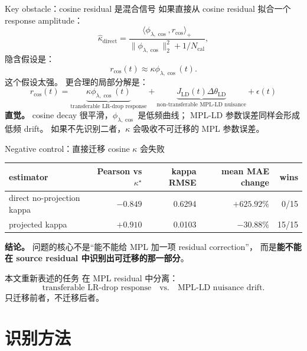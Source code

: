 \documentclass[9pt,aspectratio=169,fontset=fandol]{ctexbeamer}
\newcommand{\hl}[1]{\textcolor{blue!60!black}{\textbf{#1}}}
\begin{document}
\begin{frame}{Key obstacle：cosine residual 是混合信号}
\small
如果直接从 cosine residual 拟合一个 response amplitude：
\[
\widehat\kappa_{\mathrm{direct}}
=
\frac{\langle \phi_{\lambda,\cos},r_{\cos}\rangle_+}
{\|\phi_{\lambda,\cos}\|_2^2+1/N_{\mathrm{cal}}},
\]
隐含假设是：
\[
r_{\cos}(t)\approx \kappa\phi_{\lambda,\cos}(t).
\]
这个假设太强。
\vfill
更合理的局部分解是：
\[
\boxed{
r_{\cos}(t)
=
\underbrace{\kappa\phi_{\lambda,\cos}(t)}_{\text{transferable LR-drop response}}
+
\underbrace{J_{\mathrm{LD}}(t)\Delta\theta_{\mathrm{LD}}}_{\text{non-transferable MPL-LD nuisance}}
+
\epsilon(t)
}
\]
\vfill
\textbf{直觉。}
cosine decay 很平滑，\(\phi_{\lambda,\cos}\) 是低频曲线；
MPL-LD 参数误差同样会形成低频 drift。
如果不先识别二者，\(\kappa\) 会吸收不可迁移的 MPL 参数误差。
\end{frame}

\begin{frame}{Negative control：直接迁移 cosine \(\kappa\) 会失败}
\small
\begin{center}
\begin{tabular}{lrrrr}
\toprule
estimator & Pearson vs \(\kappa^\star\) & kappa RMSE & mean MAE change & wins\\
\midrule
direct no-projection kappa & \(-0.849\) & 0.6294 & \(+625.92\%\) & 0/15\\
projected kappa & \(+0.910\) & 0.0103 & \(-30.88\%\) & 15/15\\
\bottomrule
\end{tabular}
\end{center}
\vfill
\textbf{结论。}
问题的核心不是“能不能给 MPL 加一项 residual correction”，
而是\hl{能不能在 source residual 中识别出可迁移的那一部分}。
\vfill
\begin{block}{本文重新表述的任务}
在 MPL residual 中分离：
\[
\text{transferable LR-drop response}
\quad\text{vs.}\quad
\text{MPL-LD nuisance drift}.
\]
只迁移前者，不迁移后者。
\end{block}
\end{frame}

\section{识别方法}
\end{document}
